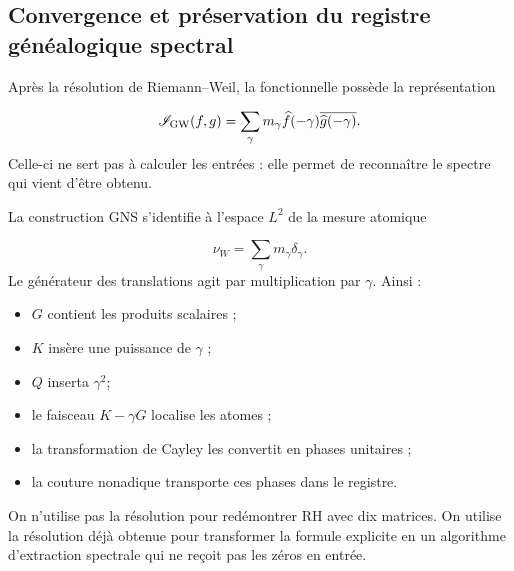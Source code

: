 \subsection{Convergence et préservation du registre généalogique spectral}
Après la résolution de Riemann–Weil, la fonctionnelle possède la représentation\par
\[
\mathscr I_{\rm GW}(f,g)
=
\sum_\gamma
m_\gamma
\widehat f(-\gamma)
\overline{\widehat g(-\gamma)}.
\]
Celle-ci ne sert pas à calculer les entrées : elle permet de reconnaître le spectre qui vient d'être obtenu.\par
La construction GNS s'identifie à l'espace \(L^2\) de la mesure atomique\par
\[
\nu_W=\sum_\gamma m_\gamma\delta_\gamma.
\]
Le générateur des translations agit par multiplication par \(\gamma\). Ainsi :\par
\begin{itemize}
\item \(G\) contient les produits scalaires ;
\item \(K\) insère une puissance de \(\gamma\) ;
\item \(Q\) inserta \(\gamma^2\);
\item le faisceau \(K-\gamma G\) localise les atomes ;
\item la transformation de Cayley les convertit en phases unitaires ;
\item la couture nonadique transporte ces phases dans le registre.
\end{itemize}
On n'utilise pas la résolution pour redémontrer RH avec dix matrices. On utilise la résolution déjà obtenue pour transformer la formule explicite en un algorithme d'extraction spectrale qui ne reçoit pas les zéros en entrée.\par
{}
